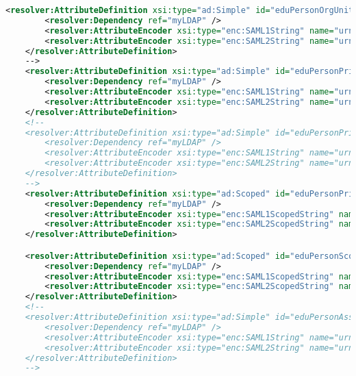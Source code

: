 \begin{lstlisting}[language=xml]
    <resolver:AttributeDefinition xsi:type="ad:Simple" id="eduPersonOrgUnitDN" sourceAttributeID="eduPersonOrgUnitDN">
        <resolver:Dependency ref="myLDAP" />
        <resolver:AttributeEncoder xsi:type="enc:SAML1String" name="urn:mace:dir:attribute-def:eduPersonOrgUnitDN" />
        <resolver:AttributeEncoder xsi:type="enc:SAML2String" name="urn:oid:1.3.6.1.4.1.5923.1.1.1.4" friendlyName="eduPersonOrgUnitDN" />
    </resolver:AttributeDefinition>
    -->
    <resolver:AttributeDefinition xsi:type="ad:Simple" id="eduPersonPrimaryAffiliation" sourceAttributeID="eduPersonPrimaryAffiliation">
        <resolver:Dependency ref="myLDAP" />
        <resolver:AttributeEncoder xsi:type="enc:SAML1String" name="urn:mace:dir:attribute-def:eduPersonPrimaryAffiliation" />
        <resolver:AttributeEncoder xsi:type="enc:SAML2String" name="urn:oid:1.3.6.1.4.1.5923.1.1.1.5" friendlyName="eduPersonPrimaryAffiliation" />
    </resolver:AttributeDefinition>
    <!--
    <resolver:AttributeDefinition xsi:type="ad:Simple" id="eduPersonPrimaryOrgUnitDN" sourceAttributeID="eduPersonPrimaryOrgUnitDN">
        <resolver:Dependency ref="myLDAP" />
        <resolver:AttributeEncoder xsi:type="enc:SAML1String" name="urn:mace:dir:attribute-def:eduPersonPrimaryOrgUnitDN" />
        <resolver:AttributeEncoder xsi:type="enc:SAML2String" name="urn:oid:1.3.6.1.4.1.5923.1.1.1.8" friendlyName="eduPersonPrimaryOrgUnitDN" />
    </resolver:AttributeDefinition>
    -->
    <resolver:AttributeDefinition xsi:type="ad:Scoped" id="eduPersonPrincipalName" scope="shib.lan" sourceAttributeID="uid">
        <resolver:Dependency ref="myLDAP" />
        <resolver:AttributeEncoder xsi:type="enc:SAML1ScopedString" name="urn:mace:dir:attribute-def:eduPersonPrincipalName" />
        <resolver:AttributeEncoder xsi:type="enc:SAML2ScopedString" name="urn:oid:1.3.6.1.4.1.5923.1.1.1.6" friendlyName="eduPersonPrincipalName" />
    </resolver:AttributeDefinition>

    <resolver:AttributeDefinition xsi:type="ad:Scoped" id="eduPersonScopedAffiliation" scope="shib.lan" sourceAttributeID="eduPersonAffiliation">
        <resolver:Dependency ref="myLDAP" />
        <resolver:AttributeEncoder xsi:type="enc:SAML1ScopedString" name="urn:mace:dir:attribute-def:eduPersonScopedAffiliation" />
        <resolver:AttributeEncoder xsi:type="enc:SAML2ScopedString" name="urn:oid:1.3.6.1.4.1.5923.1.1.1.9" friendlyName="eduPersonScopedAffiliation" />
    </resolver:AttributeDefinition>
    <!--
    <resolver:AttributeDefinition xsi:type="ad:Simple" id="eduPersonAssurance" sourceAttributeID="eduPersonAssurance">
        <resolver:Dependency ref="myLDAP" />
        <resolver:AttributeEncoder xsi:type="enc:SAML1String" name="urn:mace:dir:attribute-def:eduPersonAssurance" />
        <resolver:AttributeEncoder xsi:type="enc:SAML2String" name="urn:oid:1.3.6.1.4.1.5923.1.1.1.11" friendlyName="eduPersonAssurance" />
    </resolver:AttributeDefinition>
    -->
        

\end{lstlisting}
